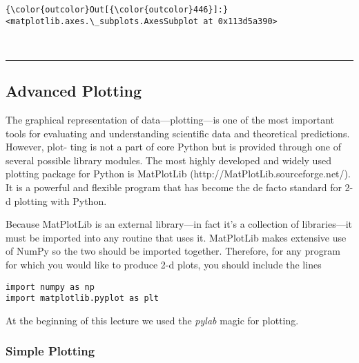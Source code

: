 \documentclass[11pt]{article}
\begin{document}
\begin{Verbatim}[commandchars=\\\{\}]
{\color{outcolor}Out[{\color{outcolor}446}]:} <matplotlib.axes.\_subplots.AxesSubplot at 0x113d5a390>
\end{Verbatim}
            
    \begin{center}
    \end{center}
    { \hspace*{\fill} \\}
    
    \begin{center}\rule{0.5\linewidth}{\linethickness}\end{center}

\hypertarget{advanced-plotting}{%
\subsection{Advanced Plotting}\label{advanced-plotting}}

The graphical representation of data---plotting---is one of the most
important tools for evaluating and understanding scientific data and
theoretical predictions. However, plot- ting is not a part of core
Python but is provided through one of several possible library modules.
The most highly developed and widely used plotting package for Python is
MatPlotLib (http://MatPlotLib.sourceforge.net/). It is a powerful and
flexible program that has become the de facto standard for 2-d plotting
with Python.

Because MatPlotLib is an external library---in fact it's a collection of
libraries---it must be imported into any routine that uses it.
MatPlotLib makes extensive use of NumPy so the two should be imported
together. Therefore, for any program for which you would like to produce
2-d plots, you should include the lines

\begin{verbatim}
import numpy as np
import matplotlib.pyplot as plt
\end{verbatim}

At the beginning of this lecture we used the \emph{pylab} magic for
plotting.

    \hypertarget{simple-plotting}{%
\subsubsection{Simple Plotting}\label{simple-plotting}}
\end{document}
